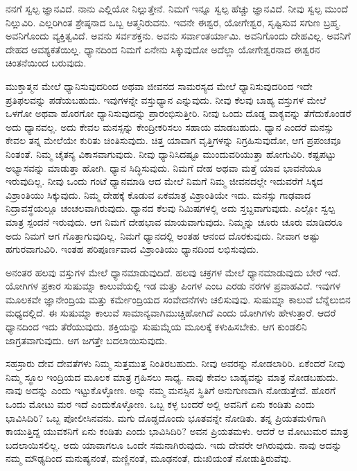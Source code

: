 ನನಗೆ ಸ್ವಲ್ಪ ಜ್ಞಾನವಿದೆ. ನಾನು ಎಲ್ಲಿಯೋ ನಿಲ್ಲುತ್ತೇನೆ. ನಿಮಗೆ ಇನ್ನೂ ಸ್ವಲ್ಪ ಹೆಚ್ಚು ಜ್ಞಾನವಿದೆ. ನೀವು ಸ್ವಲ್ಪ ಮುಂದೆ ನಿಲ್ಲುವಿರಿ. ಎಲ್ಲರಿಗಿಂತ ಶ್ರೇಷ್ಠನಾದ ಒಬ್ಬ ಆತ್ಮನಿರುವನು. ಇವನೇ ಈಶ್ವರ, ಯೋಗೇಶ್ವರ, ಸೃಷ್ಟಿಸುವ ಸಗುಣ ಬ್ರಹ್ಮ. ಅವನಿಗೊಂದು ವ್ಯಕ್ತಿತ್ವವಿದೆ. ಅವನು ಸರ್ವಶಕ್ತನು. ಅವನು ಸರ್ವಾಂತರ್ಯಾಮಿ. ಅವನಿಗೊಂದು ದೇಹವಿಲ್ಲ. ಅವನಿಗೆ ದೇಹದ ಆವಶ್ಯಕತೆಯಿಲ್ಲ. ಧ್ಯಾನದಿಂದ ನಿಮಗೆ ಏನೇನು ಸಿಕ್ಕುವುದೋ ಅದೆಲ್ಲಾ ಯೋಗೇಶ್ವರನಾದ ಈಶ್ವರನ ಚಿಂತನೆಯಿಂದ ಬರುವುದು.

ಮುಕ್ತಾತ್ಮನ ಮೇಲೆ ಧ್ಯಾನಿಸುವುದರಿಂದ ಅಥವಾ ಜೀವನದ ಸಾಮರಸ್ಯದ ಮೇಲೆ ಧ್ಯಾನಿಸುವುದರಿಂದ ಇದೇ ಪ್ರತಿಫಲವನ್ನು ಪಡೆಯಬಹುದು. ಇವುಗಳನ್ನೇ ವಸ್ತುಧ್ಯಾನ ಎನ್ನುವುದು. ನೀವು ಕೆಲವು ಬಾಹ್ಯ ವಸ್ತುಗಳ ಮೇಲೆ ಒಳಗೋ ಅಥವಾ ಹೊರಗೋ ಧ್ಯಾನಿಸುವುದನ್ನು ಪ್ರಾರಂಭಿಸುತ್ತೀರಿ. ನೀವು ಒಂದು ದೊಡ್ಡ ವಾಕ್ಯವನ್ನು ತೆಗೆದುಕೊಂಡರೆ ಅದು ಧ್ಯಾನವಲ್ಲ. ಅದು ಕೇವಲ ಮನಸ್ಸನ್ನು ಕೇಂದ್ರೀಕರಿಸಲು ಸಹಾಯ ಮಾಡಬಹುದು. ಧ್ಯಾನ ಎಂದರೆ ಮನಸ್ಸು ಕೇವಲ ತನ್ನ ಮೇಲೆಯೇ ಕುರಿತು ಚಿಂತಿಸುವುದು. ಚಿತ್ತ ಯಾವಾಗ ವೃತ್ತಿಗಳನ್ನು ನಿಗ್ರಹಿಸುವುದೋ, ಆಗ ಪ್ರಪಂಚವೂ ನಿಂತಂತೆ. ನಿಮ್ಮ ಚೈತನ್ಯ ವಿಕಾಸವಾಗುವುದು. ನೀವು ಧ್ಯಾನಿಸಿದಷ್ಟೂ ಮುಂದುವರಿಯುತ್ತಾ ಹೋಗುವಿರಿ. ಕಷ್ಟಪಟ್ಟು ಅಭ್ಯಾಸವನ್ನು ಮಾಡುತ್ತಾ ಹೋಗಿ. ಧ್ಯಾನ ಸಿದ್ಧಿಸುವುದು. ನಿಮಗೆ ದೇಹ ಅಥವಾ ಮತ್ತೆ ಯಾವ ಭಾವನೆಯೂ ಇರುವುದಿಲ್ಲ. ನೀವು ಒಂದು ಗಂಟೆ ಧ್ಯಾನಮಾಡಿ ಆದ ಮೇಲೆ ನಿಮಗೆ ನಿಮ್ಮ ಜೀವನದಲ್ಲೇ ಇದುವರೆಗೆ ಸಿಕ್ಕದ ವಿಶ್ರಾಂತಿಯು ಸಿಕ್ಕುವುದು. ನಿಮ್ಮ ದೇಹಕ್ಕೆ ಕೊಡುವ ಏಕಮಾತ್ರ ವಿಶ್ರಾಂತಿಯೇ ಇದು. ಮನಸ್ಸು ಗಾಢವಾದ ನಿದ್ರಾವಸ್ಥೆಯಲ್ಲೂ ಚಂಚಲವಾಗಿರುವುದು. ಧ್ಯಾನದ ಕೆಲವು ನಿಮಿಷಗಳಲ್ಲಿ ಅದು ಸ್ತಬ್ದವಾಗುವುದು. ಎಲ್ಲೋ ಸ್ವಲ್ಪ ಮಾತ್ರ ಸ್ಪಂದನೆ ಇರುವುದು. ಆಗ ನಿಮಗೆ ದೇಹಭಾವ ಮಾಯವಾಗುವುದು. ನಿಮ್ಮನ್ನು ಚೂರು ಚೂರು ಮಾಡಿದರೂ ಅದು ನಿಮಗೆ ಆಗ ಗೊತ್ತಾಗುವುದಿಲ್ಲ. ನಿಮಗೆ ಧ್ಯಾನದಲ್ಲಿ ಅಂತಹ ಆನಂದ ದೊರಕುವುದು. ನೀವಾಗ ಅಷ್ಟು ಹಗುರವಾಗುವಿರಿ. ಇಂತಹ ಪರಿಪೂರ್ಣವಾದ ವಿಶ್ರಾಂತಿಯು ಧ್ಯಾನದಿಂದ ಲಭಿಸುವುದು.

ಅನಂತರ ಹಲವು ವಸ್ತುಗಳ ಮೇಲೆ ಧ್ಯಾನಮಾಡುವುದಿದೆ. ಹಲವು ಚಕ್ರಗಳ ಮೇಲೆ ಧ್ಯಾನಮಾಡುವುದು ಬೇರೆ ಇದೆ. ಯೋಗಿಗಳ ಪ್ರಕಾರ ಸುಷುಮ್ನಾ ಕಾಲುವೆಯಲ್ಲಿ ಇಡ ಮತ್ತು ಪಿಂಗಳ ಎಂಬ ಎರಡು ನರಗಳ ಪ್ರವಾಹವಿದೆ. ಇವುಗಳ ಮೂಲಕವೇ ಜ್ಞಾನೇಂದ್ರಿಯ ಮತ್ತು ಕರ್ಮೇಂದ್ರಿಯದ ಸಂವೇದನೆಗಳು ಚಲಿಸುವುವು. ಸುಷುಮ್ನಾ ಕಾಲುವೆ ಬೆನ್ನೆಲುಬಿನ ಮಧ್ಯದಲ್ಲಿದೆ. ಈ ಸುಷುಮ್ನಾ ಕಾಲುವೆ ಸಾಮಾನ್ಯವಾಗಿ\break ಮುಚ್ಚಿಹೋಗಿದೆ ಎಂದು ಯೋಗಿಗಳು ಹೇಳುತ್ತಾರೆ. ಆದರೆ ಧ್ಯಾನದಿಂದ ಇದು ತೆರೆಯುವುದು. ಶಕ್ತಿಯನ್ನು ಸುಷುಮ್ನೆಯ ಮೂಲಕ್ಕೆ ಕಳುಹಿಸಬೇಕು. ಆಗ ಕುಂಡಲಿನಿ ಜಾಗ್ರತವಾಗುವುದು. ಆಗ ಜಗತ್ತೇ ಬದಲಾಯಿಸುವುದು.

ಸಹಸ್ರಾರು ದೇವ ದೇವತೆಗಳು ನಿಮ್ಮ ಸುತ್ತಮುತ್ತ ನಿಂತಿರಬಹುದು. ನೀವು ಅವರನ್ನು ನೋಡಲಾರಿರಿ. ಏಕೆಂದರೆ ನೀವು ನಿಮ್ಮ ಸ್ಥೂಲ ಇಂದ್ರಿಯದ ಮೂಲಕ ಮಾತ್ರ ಗ್ರಹಿಸಲು ಸಾಧ್ಯ. ನಾವು ಕೇವಲ ಬಾಹ್ಯವನ್ನು ಮಾತ್ರ ನೋಡಬಹುದು. ನಾವು ಅದನ್ನು  ಎಂದು ಇಟ್ಟುಕೊಳ್ಳೋಣ.  ಅನ್ನು ನಮ್ಮ ಮನಸ್ಸಿನ ಸ್ಥಿತಿಗೆ ಅನುಗುಣವಾಗಿ ನೋಡುತ್ತೇವೆ. ಹೊರಗೆ ಒಂದು ಮೋಟು ಮರ ಇದೆ ಎಂದುಕೊಳ್ಳೋಣ. ಒಬ್ಬ ಕಳ್ಳ ಬಂದರೆ ಅಲ್ಲಿ ಅವನಿಗೆ ಏನು ಕಂಡಿತು ಎಂದು ಭಾವಿಸಿದಿರಿ? ಒಬ್ಬ ಪೋಲೀಸಿನವನು. ಮಗು ದೊಡ್ಡದೊಂದು ಭೂತವನ್ನೇ ನೋಡಿತು. ತನ್ನ ಪ್ರಿಯತಮಳಿಗಾಗಿ ಕಾಯುತ್ತಿದ್ದ ಯುವಕನಿಗೆ ಏನು ಕಂಡಿತು ಎಂದು ಭಾವಿಸಿದಿರಿ? ಅವನ ಪ್ರಿಯತಮಳು. ಆದರೆ ಆ ಮೋಟುಮರ ಮಾತ್ರ ಬದಲಾಯಿಸಲಿಲ್ಲ. ಅದು ಯಾವಾಗಲೂ ಒಂದೇ ಸಮನಾಗಿರುವುದು. ಇದು ದೇವರೇ ಆಗಿರುವುದು. ನಾವು ಅದನ್ನು ನಮ್ಮ ಮೌಢ್ಯದಿಂದ ಮನುಷ್ಯನಂತೆ, ಮಣ್ಣಿನಂತೆ, ಮೂಢನಂತೆ, ದುಃಖಿಯಂತೆ ನೋಡುತ್ತಿರುವೆವು.

